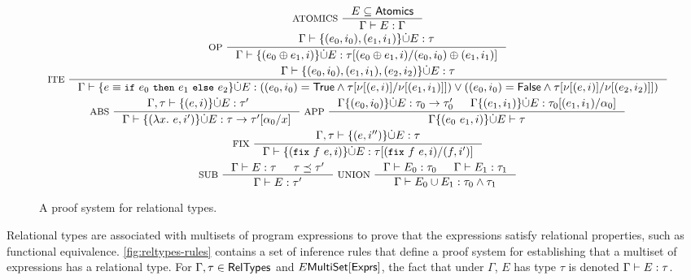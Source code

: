 \begin{figure}
  \centering
  \begin{gather*}
    \inference[ ATOMICS ]{ %
      E \subseteq \atomics %
    }{ \Gamma \judges E : \Gamma } \\
    \inference[ OP ]{ 
      \Gamma \judges %
      \elts{ (e_0, i_0), (e_1, i_1) } \disjunion E : \tau }{ %
      \Gamma \judges \disjadd{ (e_0 \oplus e_1, i) }{ E } : %
      \replace{ \tau }{ (e_0, i_0) \oplus (e_1, i_1) }{ %
        (e_0 \oplus e_1, i) } } \\
    \inference[ ITE ]{ %
      \Gamma \judges %
      \elts{ (e_0, i_0), (e_1, i_1), (e_2, i_2) } \disjunion E : %
      \tau }{ %
      \Gamma \judges \disjadd{ e \equiv \ite{ e_0 }{ e_1 }{ e_2 } }{ E } : %
      ((e_0, i_0) = \true \land %
      \replace{ \tau }{ \resvar{ (e_1, i_1) } }{ \resvar{(e, i)}
        }) \lor %
        ((e_0, i_0) = \false \land %
        \replace{ \tau }{ \resvar{(e_2, i_2)} }{\resvar{(e, i)}}) } \\
    \inference[ ABS ]{ \Gamma, \tau \judges \disjadd{ (e, i) }{ E } : \tau' &
    }{ %
      \Gamma \judges \disjadd{ (\lambda x.\ e, i') }{ E } : %
      \replace{ \tau \rightarrow \tau' }{ x }{ \alpha_0 } } 
    \inference[ APP ]{ %
      \Gamma \disjadd{ (e_0, i_0) }{ E } : \tau_0 \rightarrow \tau_0' & 
      \Gamma \disjadd{ (e_1, i_1) }{ E } : %
      \replace{ \tau_0 }{ \alpha_0 }{ (e_1, i_1) }
    }{ \Gamma \disjadd{ (e_0\ e_1, i) }{ E } \judges \tau } \\
    \inference[ FIX ]{ %
      \Gamma, \tau \judges \disjadd{ (e, i'') }{ E } : \tau }{ %
      \Gamma \judges \disjadd{ ( \fix{ f }{ e }, i ) }{ E } : %
      \replace{ \tau }{ (f, i') }{ ( \fix{ f }{ e }, i ) }
    } \\
    \inference[ SUB ]{ %
      \Gamma \judges E : \tau & \tau \subtype \tau'
    }{ \Gamma \judges E : \tau' } 
    \inference[ UNION ]{ 
      \Gamma \judges E_0 : \tau_0 &
      \Gamma \judges E_1 : \tau_1 } %
    { \Gamma \judges E_0 \union E_1 : \tau_0 \land \tau_1 } 
  \end{gather*}
  \caption{A proof system for relational types.}
  \label{fig:reltypes-rules}
\end{figure}
%
%
%
Relational types are associated with multisets of program expressions
to prove that the expressions satisfy relational properties, such as
functional equivalence.
%
\autoref{fig:reltypes-rules} contains a set of inference rules that
define a proof system for establishing that a multiset of expressions
has a relational type.
%
For $\Gamma, \tau \in \mathsf{RelTypes}$ and $E \mathsf{MultiSet}[  \mathsf{Exprs}  ]$, the fact
that under $\Gamma$, $E$ has type $\tau$ is denoted $\Gamma \vdash E
: \tau$.

